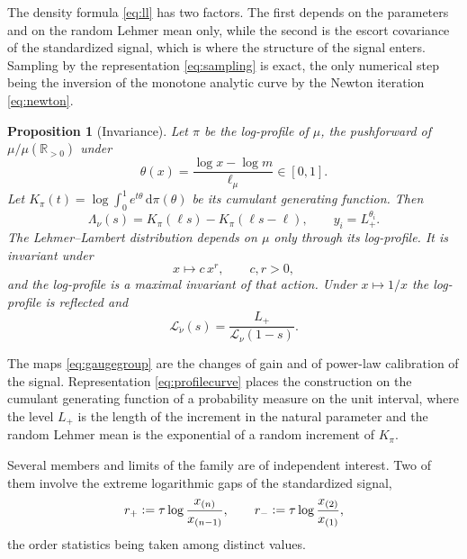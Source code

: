 \documentclass[sn-mathphys-num]{sn-jnl}\newcommand{\SNJNL}{}
\theoremstyle{thmstyleone}
\newtheorem{proposition}{Proposition}
\theoremstyle{thmstyletwo}
\theoremstyle{thmstylethree}
\theoremstyle{thmstyleone}
\providecommand{\Rpos}{\mathbb{R}_{>0}}
\providecommand{\Leh}{\mathscr{L}}
\providecommand{\dd}{\,\mathrm{d}}
\providecommand{\eqdef}{\mathrel{\vcentcolon=}}
\begin{document}
	The density formula \eqref{eq:ll} has two factors. The first depends on the
	parameters and on the random Lehmer mean only, while the second is
	the escort covariance of the standardized signal, which is where the
	structure of the signal enters. Sampling by the representation \eqref{eq:sampling} is exact, the
	only numerical step being the inversion of the monotone analytic
	curve by the Newton iteration \eqref{eq:newton}.
	
	\begin{proposition}[Invariance]
		\label{prop:invariance}
		Let $\pi$ be the \emph{log-profile} of $\mu$, the pushforward of
		$\mu/\mu(\Rpos)$ under
		\begin{equation}\label{eq:theta}
			\theta(x)=\frac{\log x-\log m}{\ell_\mu}\in[0,1].
		\end{equation}
		Let $K_\pi(t)=\log\int_0^1e^{t\theta}\dd\pi(\theta)$ be its cumulant
		generating function. Then
		\begin{equation}\label{eq:profilecurve}
			\Lambda_\nu(s)=K_\pi(\ell s)-K_\pi(\ell s-\ell),
			\qquad
			y_i=L_+^{\theta_i}.
		\end{equation}
		The Lehmer--Lambert distribution depends on $\mu$ only through its
		log-profile. It is invariant under
		\begin{equation}\label{eq:gaugegroup}
			x\longmapsto c\,x^{r},\qquad c,r>0,
		\end{equation}
		and the log-profile is a maximal invariant of that action. Under
		$x\mapsto1/x$ the log-profile is reflected and
		\begin{equation}\label{eq:reflection}
			\Leh_{\check\nu}(s)=\frac{L_+}{\Leh_\nu(1-s)} .
		\end{equation}
	\end{proposition}
	
	The maps \eqref{eq:gaugegroup} are the changes of gain and of
	power-law calibration of the signal. Representation
	\eqref{eq:profilecurve} places the construction on the cumulant
	generating function of a probability measure on the unit interval,
	where the level $L_+$ is the length of the increment in the natural
	parameter and the random Lehmer mean is the exponential of a random
	increment of $K_\pi$.
	
	Several members and limits of the family are of independent
	interest. Two of them involve the extreme logarithmic gaps of the
	standardized signal,
	\begin{equation}\label{eq:gaps}
		r_+\eqdef\tau\log\frac{x_{(n)}}{x_{(n-1)}},
		\qquad
		r_-\eqdef\tau\log\frac{x_{(2)}}{x_{(1)}},
	\end{equation}
	the order statistics being taken among distinct values.
	
\end{document}
